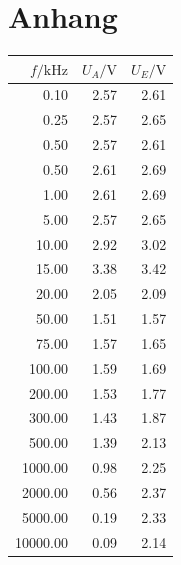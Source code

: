 \documentclass[]{scrartcl}
\let\oldsection\section
\renewcommand\section{\clearpage\oldsection}
\begin{document}
\section{Anhang}

\begin{table}[H]
	\centering
	\label{tab:ggverst_a}
	\hskip-1.50cm
	\begin{tabular}{r r r}
		\toprule
		$f / \si{\kilo\hertz}$ & $U_A/\si{\volt}$ & $U_E/\si{\volt}$ \\
		\midrule
		0.10	&	2.57	&	2.61 \\
		0.25	&	2.57	&	2.65 \\
		0.50	&	2.57	&	2.61 \\
		0.50	&	2.61	&	2.69 \\
		1.00	&	2.61	&	2.69 \\
		5.00	&	2.57	&	2.65 \\
		10.00	&	2.92	&	3.02 \\
		15.00	&	3.38	&	3.42 \\
		20.00	&	2.05	&	2.09 \\
		50.00	&	1.51	&	1.57 \\
		75.00	&	1.57	&	1.65 \\
		100.00	&	1.59	&	1.69 \\
		200.00	&	1.53	&	1.77 \\
		300.00	&	1.43	&	1.87 \\
		500.00	&	1.39	&	2.13 \\
		1000.00	&	0.98	&	2.25 \\
		2000.00	&	0.56	&	2.37 \\
		5000.00	&	0.19	&	2.33 \\
		10000.00	&	0.09	&	2.14 \\
		\bottomrule
	\end{tabular}
\end{table}
\end{document}
